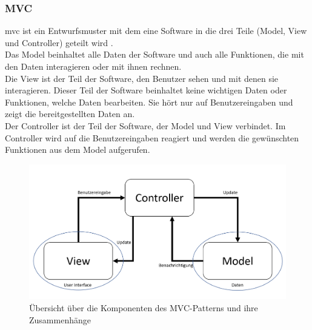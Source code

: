 \subsubsection{MVC}
\Gls{mvc} ist ein Entwurfsmuster mit dem eine Software in die drei Teile (Model, View und Controller) geteilt wird \cite{mvc}.\\
Das Model beinhaltet alle Daten der Software und auch alle Funktionen, die mit den Daten interagieren oder mit ihnen rechnen.\\
Die View ist der Teil der Software, den Benutzer sehen und mit denen sie interagieren. Dieser Teil der Software beinhaltet keine wichtigen Daten oder Funktionen, welche Daten bearbeiten. Sie hört nur auf Benutzereingaben und zeigt die bereitgestellten Daten an.\\
Der Controller ist der Teil der Software, der Model und View verbindet. Im Controller wird auf die Benutzereingaben reagiert und werden die gewünschten Funktionen aus dem Model aufgerufen.
\begin{figure}[H]
	\centering
	\includegraphics[width=0.8\linewidth]{images/mvc}
	\caption[Übersicht des MVC-Patterns]{Übersicht über die Komponenten des MVC-Patterns und ihre Zusammenhänge}
	\label{fig:mvc}
\end{figure}
